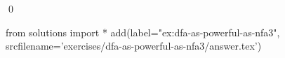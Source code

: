 
\begin{ex} 
  \label{ex:dfa-as-powerful-as-nfa3}
  
  \qed
\end{ex} 
\begin{python0}
from solutions import *
add(label="ex:dfa-as-powerful-as-nfa3",
    srcfilename='exercises/dfa-as-powerful-as-nfa3/answer.tex') 
\end{python0}
